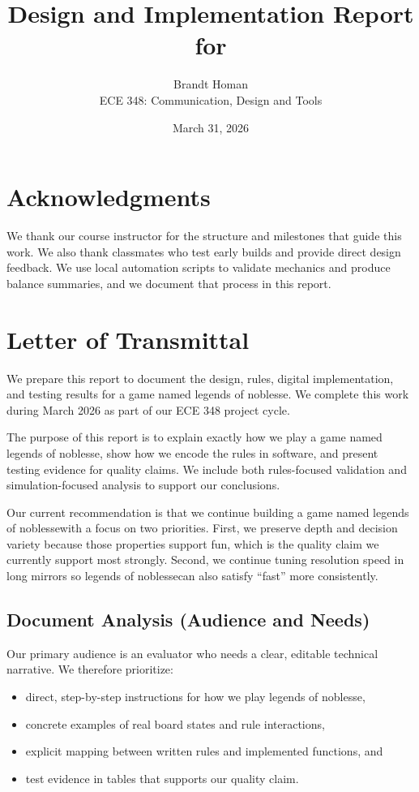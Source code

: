 \documentclass[12pt]{article}
\title{Design and Implementation Report for \NamedGame}
\author{Brandt Homan \\ \large ECE 348: Communication, Design and Tools}
\date{March 31, 2026}
\newcommand{\GameName}{legends of noblesse}
\newcommand{\NamedGame}{a game named legends of noblesse}
\begin{document}
\maketitle
\thispagestyle{empty}
\newpage

\section*{Acknowledgments}
We thank our course instructor for the structure and milestones that guide this work. We also thank classmates who test early builds and provide direct design feedback. We use local automation scripts to validate mechanics and produce balance summaries, and we document that process in this report.

\newpage

\section*{Letter of Transmittal}
We prepare this report to document the design, rules, digital implementation, and testing results for \NamedGame. We complete this work during March 2026 as part of our ECE 348 project cycle.

The purpose of this report is to explain exactly how we play \NamedGame, show how we encode the rules in software, and present testing evidence for quality claims. We include both rules-focused validation and simulation-focused analysis to support our conclusions.

Our current recommendation is that we continue building \NamedGame with a focus on two priorities. First, we preserve depth and decision variety because those properties support fun, which is the quality claim we currently support most strongly. Second, we continue tuning resolution speed in long mirrors so \GameName can also satisfy ``fast'' more consistently.

\subsection*{Document Analysis (Audience and Needs)}
Our primary audience is an evaluator who needs a clear, editable technical narrative. We therefore prioritize:
\begin{itemize}
    \item direct, step-by-step instructions for how we play \GameName,
    \item concrete examples of real board states and rule interactions,
    \item explicit mapping between written rules and implemented functions, and
    \item test evidence in tables that supports our quality claim.
\end{itemize}
\end{document}
